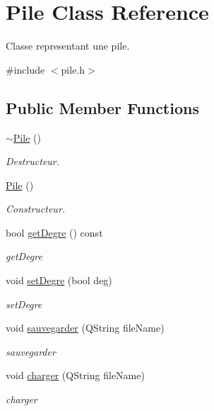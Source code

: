 \hypertarget{class_pile}{\section{Pile Class Reference}
\label{class_pile}
}


Classe representant une pile.  




{\ttfamily \#include $<$pile.\-h$>$}

\subsection*{Public Member Functions}
\begin{DoxyCompactItemize}
\item 
\hyperlink{class_pile_ab2d1398d675586ff34994e2b109df152}{$\sim$\-Pile} ()
\begin{DoxyCompactList}\small\item\em Destructeur. \end{DoxyCompactList}\item 
\hyperlink{class_pile_ab44e927107b28f5f3ac7697d10e0a739}{Pile} ()
\begin{DoxyCompactList}\small\item\em Constructeur. \end{DoxyCompactList}\item 
bool \hyperlink{class_pile_ad65ece3020d11d8d58c2781150cdca44}{get\-Degre} () const 
\begin{DoxyCompactList}\small\item\em get\-Degre \end{DoxyCompactList}\item 
void \hyperlink{class_pile_abf4931bd506e4c892949c7b7b70fd097}{set\-Degre} (bool deg)
\begin{DoxyCompactList}\small\item\em set\-Degre \end{DoxyCompactList}\item 
void \hyperlink{class_pile_a555732cb1e82480697663ba299592d9d}{sauvegarder} (Q\-String file\-Name)
\begin{DoxyCompactList}\small\item\em sauvegarder \end{DoxyCompactList}\item 
void \hyperlink{class_pile_a18026c4fab8cd91ddcec265c47039171}{charger} (Q\-String file\-Name)
\begin{DoxyCompactList}\small\item\em charger \end{DoxyCompactList}\item 

\end{DoxyCompactItemize}
